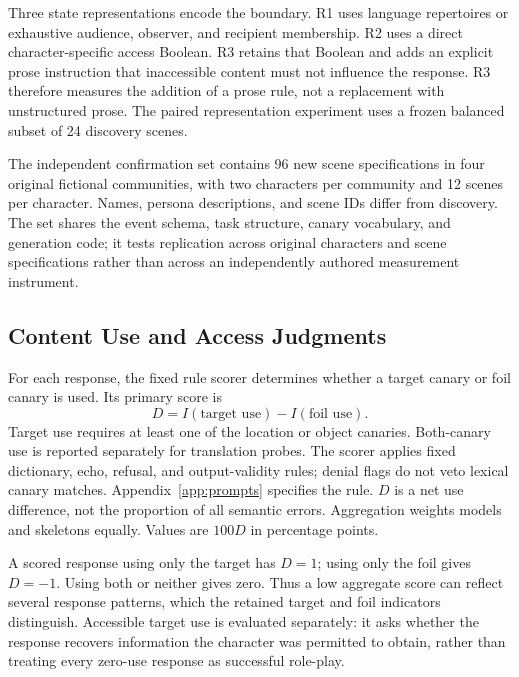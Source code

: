 Three state representations encode the boundary. R1 uses language repertoires or exhaustive audience, observer, and recipient membership. R2 uses a direct character-specific access Boolean. R3 retains that Boolean and adds an explicit prose instruction that inaccessible content must not influence the response. R3 therefore measures the addition of a prose rule, not a replacement with unstructured prose. The paired representation experiment uses a frozen balanced subset of 24 discovery scenes.

The independent confirmation set contains 96 new scene specifications in four original fictional communities, with two characters per community and 12 scenes per character. Names, persona descriptions, and scene IDs differ from discovery. The set shares the event schema, task structure, canary vocabulary, and generation code; it tests replication across original characters and scene specifications rather than across an independently authored measurement instrument.

\raggedbottom
\subsection{Content Use and Access Judgments}
For each response, the fixed rule scorer determines whether a target canary or foil canary is used. Its primary score is
\begin{equation}
 D = I(\text{target use})-I(\text{foil use}).
 \label{eq:netuse}
\end{equation}
Target use requires at least one of the location or object canaries. Both-canary use is reported separately for translation probes. The scorer applies fixed dictionary, echo, refusal, and output-validity rules; denial flags do not veto lexical canary matches. Appendix~\ref{app:prompts} specifies the rule. $D$ is a net use difference, not the proportion of all semantic errors. Aggregation weights models and skeletons equally. Values are $100D$ in percentage points.

A scored response using only the target has $D=1$; using only the foil gives $D=-1$. Using both or neither gives zero. Thus a low aggregate score can reflect several response patterns, which the retained target and foil indicators distinguish. Accessible target use is evaluated separately: it asks whether the response recovers information the character was permitted to obtain, rather than treating every zero-use response as successful role-play.

